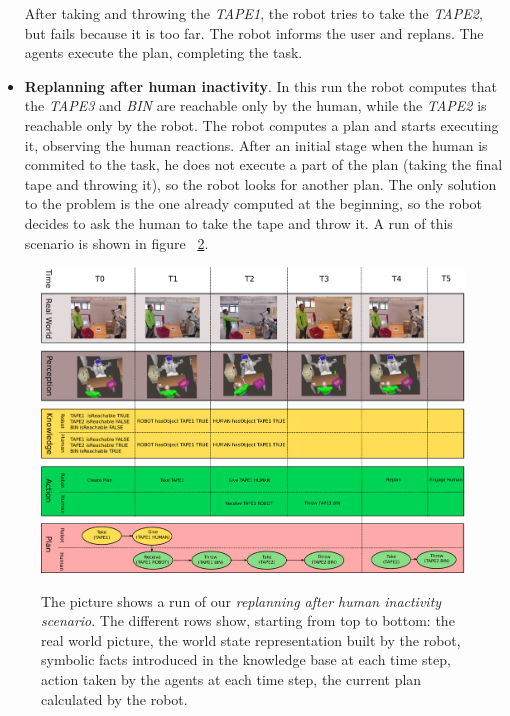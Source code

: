\begin{itemize}
\begin{figure}
{      }
  \label{fig:coworker_results-scenario3}
\end{figure}


After taking and throwing the \textit{TAPE1}, the robot tries to take the
\textit{TAPE2}, but fails because it is too far. The robot informs the user
and replans. The agents execute the plan, completing the task.

\item
\textbf{Replanning after human inactivity}.
In this run the robot computes that the \textit{TAPE3} and \textit{BIN}
are reachable only by the human, while the \textit{TAPE2} is reachable only by the robot. The robot computes a plan
and starts executing it, observing the human reactions. 
 After an initial stage when the human is
commited to the task, he does not execute a part of the plan (taking
the final tape and throwing it), so the robot looks for another
plan. The only solution to the problem is the one already computed at
the beginning, so the robot decides to ask
 the human to take the tape and throw it. A run of this
scenario is shown in figure ~\ref{fig:coworker_results-experiment}. 
\end{itemize}

 
\begin{figure}
  \caption[Robot coworker experiment 4]{The picture shows a run of our \textit{replanning after human
    inactivity scenario}. The different
    rows show, starting from top to bottom: the real world picture,
    the world state representation built by the robot, symbolic facts
    introduced in the knowledge base at each time step, action taken by the
    agents at each time step, the current plan calculated by the robot.}
  \centering
  \includegraphics[angle=90, scale=0.7]{img/coworker/results/complete_plan.pdf}
  \label{fig:coworker_results-experiment}

\end {figure}


